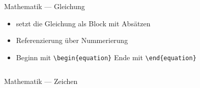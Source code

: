 \documentclass[presentation,aspectratio=169]{beamer}
\begin{document}
\begin{frame}[fragile]{Mathematik --- Gleichung}
  \begin{itemize}
    \item setzt die Gleichung als Block mit Absätzen
    \item Referenzierung über Nummerierung
    \item Beginn mit \verb|\begin{equation}| Ende mit \verb|\end{equation}|
  \end{itemize}
  
  \begin{minipage}{.4\textwidth}
    
  \end{minipage}
  \hfill
  \begin{minipage}{.5\textwidth}
    \inputminted{latex}{codebeispiele/math-equation.tex}
  \end{minipage}
\end{frame}

\begin{frame}[fragile]{Mathematik --- Zeichen}
  \begin{minipage}{.4\textwidth}
    
  \end{minipage}
  \hfill
  \begin{minipage}{.5\textwidth}
    \inputminted{latex}{codebeispiele/math-symbols.tex}
  \end{minipage}
\end{frame}
\end{document}

